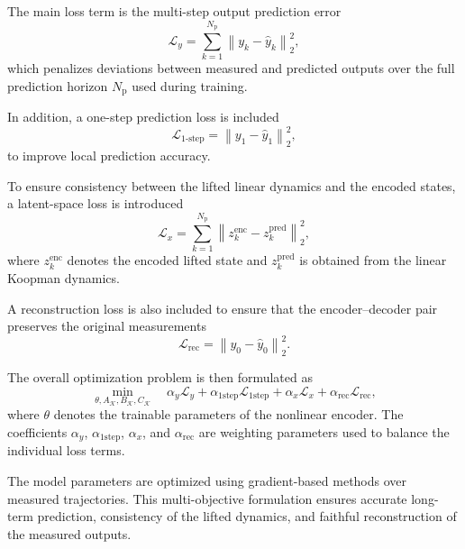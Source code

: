 The main loss term is the multi-step output prediction error
\begin{equation}
\mathcal{L}_{y} =
\sum_{k=1}^{N_{\mathrm{p}}}
\left\| y_k - \hat{y}_k \right\|_2^2,
\end{equation}
which penalizes deviations between measured and predicted outputs over the full prediction horizon $N_{\mathrm{p}}$ used during training.

In addition, a one-step prediction loss is included
\begin{equation}
\mathcal{L}_{\text{1-step}} =
\left\| y_1 - \hat{y}_1 \right\|_2^2,
\end{equation}
to improve local prediction accuracy.

To ensure consistency between the lifted linear dynamics and the encoded states, a latent-space loss is introduced
\begin{equation}
    \mathcal{L}_{x} =
    \sum_{k=1}^{N_{\mathrm{p}}}
    \left\| z_k^{\mathrm{enc}} - z_k^{\mathrm{pred}} \right\|_2^2,
    \end{equation}
where $z_k^{\text{enc}}$ denotes the encoded lifted state and $z_k^{\text{pred}}$ is obtained from the linear Koopman dynamics.

A reconstruction loss is also included to ensure that the encoder--decoder pair preserves the original measurements
\begin{equation}
\mathcal{L}_{\text{rec}} =
\left\| y_0 - \hat{y}_0 \right\|_2^2.
\end{equation}

The overall optimization problem is then formulated as
\begin{equation}
\min_{\theta, A_{\mathcal{K}}, B_{\mathcal{K}}, C_{\mathcal{K}}}
\quad
\alpha_y \mathcal{L}_{y}
+ \alpha_{\mathrm{1step}} \mathcal{L}_{\mathrm{1step}}
+ \alpha_x \mathcal{L}_{x}
+ \alpha_{\mathrm{rec}} \mathcal{L}_{\mathrm{rec}},
\label{eq:koopman_training_loss}
\end{equation}
where $\theta$ denotes the trainable parameters of the nonlinear encoder. The coefficients
$\alpha_y$, $\alpha_{\mathrm{1step}}$, $\alpha_x$, and $\alpha_{\mathrm{rec}}$ are weighting parameters used to balance the individual loss terms.

The model parameters are optimized using gradient-based methods over measured trajectories. 
This multi-objective formulation ensures accurate long-term prediction, consistency of the lifted dynamics, and faithful reconstruction of the measured outputs.

